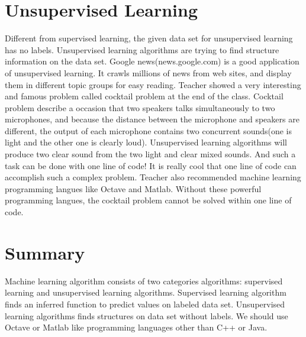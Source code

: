 \documentclass{article}
\begin{document}
\section{Unsupervised Learning}
Different from supervised learning, the given data set for unsupervised learning has no labels. Unsupervised learning algorithms are trying to find structure information on the data set. Google news(news.google.com) is a good application of unsupervised learning. It crawls millions of news from web sites, and display them in different topic groups for easy reading. Teacher showed a very interesting and famous problem called cocktail problem at the end of the class. Cocktail problem describe a occasion that two speakers talks simultaneously to two microphones, and because the distance between the microphone and speakers are different, the output of each microphone contains two concurrent sounds(one is light and the other one is clearly loud). Unsupervised learning algorithms will produce two clear sound from the two light and clear mixed sounds. And such a task can be done with one line of code! It is really cool that one line of code can accomplish such a complex problem. Teacher also recommended machine learning programming langues like Octave and Matlab. Without these powerful programming langues, the cocktail problem cannot be solved within one line of code.

\section{Summary}
Machine learning algorithm consists of two categories algorithms: supervised learning and unsupervised learning algorithms. Supervised learning algorithm finds an inferred function to predict values on labeled data set. Unsupervised learning algorithms finds structures on data set without labels. We should use Octave or Matlab like programming languages other than C++ or Java.
\end{document}
